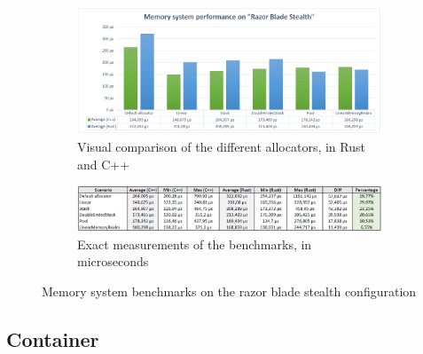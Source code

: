 \begin{figure}[h!]
	\centering
	\begin{subfigure}[b]{\textwidth}
		\includegraphics[width=1\linewidth]{PICs/mem_bench_blade.png}
		\caption{Visual comparison of the different allocators, in Rust and C++}
		\label{fig:Ng1} 
	\end{subfigure}
	
	\begin{subfigure}[b]{\textwidth}
		\includegraphics[width=1\linewidth]{PICs/mem_bench_blade_data.png}
		\caption{Exact measurements of the benchmarks, in microseconds}
		\label{fig:Ng2}
	\end{subfigure}
	
	\caption[Memory benchmarks blade]{Memory system benchmarks on the razor blade stealth configuration}
\end{figure}

\clearpage

\subsection{Container}

